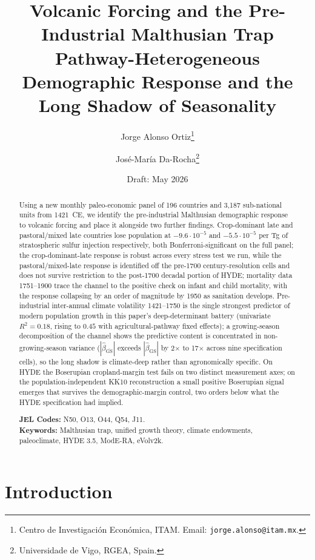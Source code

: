 \documentclass[11pt,letterpaper]{article}
\title{Volcanic Forcing and the Pre-Industrial Malthusian Trap\\
{\large Pathway-Heterogeneous Demographic Response and the Long Shadow of Seasonality}}
\author{Jorge Alonso Ortiz\thanks{Centro de Investigación Económica, ITAM. Email: \texttt{jorge.alonso@itam.mx}.}
  \and Jos\'e-Mar\'ia Da-Rocha\thanks{Universidade de Vigo, RGEA, Spain.}}
\date{Draft: May 2026}
\begin{document}
\maketitle

\begin{abstract}
\noindent
Using a new monthly paleo-economic panel of 196 countries and 3{,}187 sub-national units from 1421~CE, we identify the pre-industrial Malthusian demographic response to volcanic forcing and place it alongside two further findings. Crop-dominant late and pastoral/mixed late countries lose population at $-9.6\!\cdot\!10^{-5}$ and $-5.5\!\cdot\!10^{-5}$ per Tg of stratospheric sulfur injection respectively, both Bonferroni-significant on the full panel; the crop-dominant-late response is robust across every stress test we run, while the pastoral/mixed-late response is identified off the pre-1700 century-resolution cells and does not survive restriction to the post-1700 decadal portion of HYDE; mortality data 1751--1900 trace the channel to the positive check on infant and child mortality, with the response collapsing by an order of magnitude by 1950 as sanitation develops. Pre-industrial inter-annual climate volatility 1421--1750 is the single strongest predictor of modern population growth in this paper's deep-determinant battery (univariate $R^2=0.18$, rising to $0.45$ with agricultural-pathway fixed effects); a growing-season decomposition of the channel shows the predictive content is concentrated in non-growing-season variance ($|\hat\beta_{\overline{\mathrm{GS}}}|$ exceeds $|\hat\beta_{\mathrm{GS}}|$ by 2$\times$ to 17$\times$ across nine specification cells), so the long shadow is climate-deep rather than agronomically specific. On HYDE the Boserupian cropland-margin test fails on two distinct measurement axes; on the population-independent KK10 reconstruction \citep{kaplan2011} a small positive Boserupian signal emerges that survives the demographic-margin control, two orders below what the HYDE specification had implied.

\medskip
\noindent\textbf{JEL Codes:} N50, O13, O44, Q54, J11.\\
\textbf{Keywords:} Malthusian trap, unified growth theory, climate endowments, paleoclimate, HYDE 3.5, ModE-RA, eVolv2k.
\end{abstract}

\section{Introduction}
\end{document}
